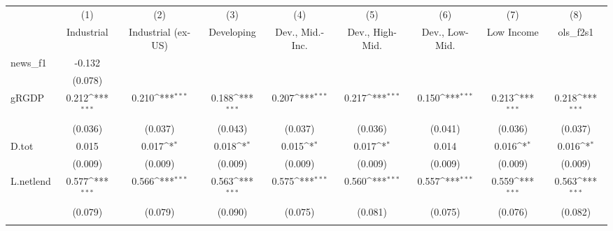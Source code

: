 {
\def\sym#1{\ifmmode^{#1}\else\(^{#1}\)\fi}
\begin{tabular}{l*{8}{c}}
\toprule
            &\multicolumn{1}{c}{(1)}&\multicolumn{1}{c}{(2)}&\multicolumn{1}{c}{(3)}&\multicolumn{1}{c}{(4)}&\multicolumn{1}{c}{(5)}&\multicolumn{1}{c}{(6)}&\multicolumn{1}{c}{(7)}&\multicolumn{1}{c}{(8)}\\
            &\multicolumn{1}{c}{Industrial}&\multicolumn{1}{c}{Industrial (ex-US)}&\multicolumn{1}{c}{Developing}&\multicolumn{1}{c}{Dev., Mid.-Inc.}&\multicolumn{1}{c}{Dev., High-Mid.}&\multicolumn{1}{c}{Dev., Low-Mid.}&\multicolumn{1}{c}{Low Income}&\multicolumn{1}{c}{ols\_f2s1}\\
\midrule
news\_f1     &      -0.132         &                     &                     &                     &                     &                     &                     &                     \\
            &     (0.078)         &                     &                     &                     &                     &                     &                     &                     \\
\addlinespace
gRGDP       &       0.212\sym{***}&       0.210\sym{***}&       0.188\sym{***}&       0.207\sym{***}&       0.217\sym{***}&       0.150\sym{***}&       0.213\sym{***}&       0.218\sym{***}\\
            &     (0.036)         &     (0.037)         &     (0.043)         &     (0.037)         &     (0.036)         &     (0.041)         &     (0.036)         &     (0.037)         \\
\addlinespace
D.tot       &       0.015         &       0.017\sym{*}  &       0.018\sym{*}  &       0.015\sym{*}  &       0.017\sym{*}  &       0.014         &       0.016\sym{*}  &       0.016\sym{*}  \\
            &     (0.009)         &     (0.009)         &     (0.009)         &     (0.009)         &     (0.009)         &     (0.009)         &     (0.009)         &     (0.009)         \\
\addlinespace
L.netlend   &       0.577\sym{***}&       0.566\sym{***}&       0.563\sym{***}&       0.575\sym{***}&       0.560\sym{***}&       0.557\sym{***}&       0.559\sym{***}&       0.563\sym{***}\\
            &     (0.079)         &     (0.079)         &     (0.090)         &     (0.075)         &     (0.081)         &     (0.075)         &     (0.076)         &     (0.082)         \\
\addlinespace

\end{tabular}}
